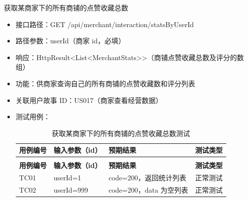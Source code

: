 \begin{levellist}
\begin{levellist}
        \item 获取某商家下的所有商铺的点赞收藏总数
        \begin{itemize}
            \item 接口路径：GET /api/merchant/interaction/statsByUserId
            \item 路径参数：userId（商家 id，必填）
            \item 响应：HttpResult<List<MerchantStats>>（商铺点赞收藏总数及评分的数组）
            \item 功能：供商家查询自己的所有商铺的点赞收藏数和评分列表
            \item 关联用户故事 ID：US017（商家查看经营数据）
            \item 测试用例：
                  \begin{longtable}{>{\centering\arraybackslash}m{2cm} >{\centering\arraybackslash}m{4cm} >{\centering\arraybackslash}m{5cm} >{\centering\arraybackslash}m{2cm}}

                      \caption{获取某商家下的所有商铺的点赞收藏总数测试} \label{tab:training}                    \\

                      \toprule
                      \textbf{用例编号} & \textbf{输入参数（id）} & \textbf{预期结果}      & \textbf{测试类型} \\
                      \midrule
                      \endfirsthead

                      \multicolumn{4}{c}{{\tablename\ \thetable{} 续表}}                       \\
                      \toprule
                      \textbf{用例编号} & \textbf{输入参数（id）} & \textbf{预期结果}      & \textbf{测试类型} \\
                      \midrule
                      \endhead

                      \bottomrule
                      \endfoot

                      TC01          & userId=1          & code=200，返回统计列表    & 正常测试          \\
                      TC02          & userId=999        & code=200，data 为空列表 & 正常测试          \\
                  \end{longtable}
        \end{itemize}


\end{levellist}
\end{levellist}
